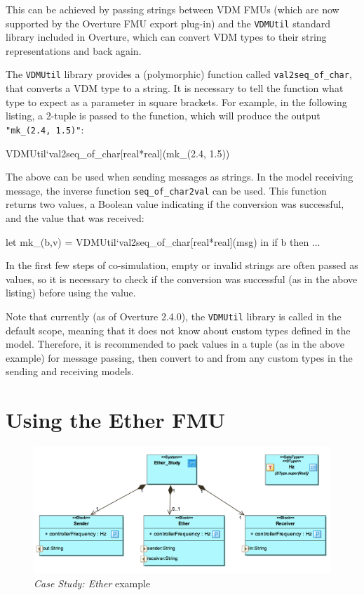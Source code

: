 This can be achieved by passing strings between VDM FMUs (which are now supported by the Overture FMU export plug-in) and the \texttt{VDMUtil} standard library included in Overture, which can convert VDM types to their string representations and back again.

The \texttt{VDMUtil} library provides a (polymorphic) function called \texttt{val2seq\_of\_char}, that converts a VDM type to a string. It is necessary to tell the function what type to expect as a parameter in square brackets. For example, in the following listing, a 2-tuple is passed to the function, which will produce the output \texttt{"mk\_(2.4, 1.5)"}:

\begin{vdm}
VDMUtil`val2seq_of_char[real*real](mk_(2.4, 1.5))
\end{vdm}

The above can be used when sending messages as strings. In the model receiving message, the inverse function \texttt{seq\_of\_char2val} can be used. This function returns two values, a Boolean value indicating if the conversion was successful, and the value that was received:

\begin{vdm}
let mk_(b,v) = VDMUtil`val2seq_of_char[real*real](msg) in
  if b then ...
\end{vdm}

In the first few steps of co-simulation, empty or invalid strings are often passed as values, so it is necessary to check if the conversion was successful (as in the above listing) before using the value.

Note that currently (as of Overture 2.4.0), the \texttt{VDMUtil} library is called in the default scope, meaning that it does not know about custom types defined in the model. Therefore, it is recommended to pack values in a tuple (as in the above example) for message passing, then convert to and from any custom types in the sending and receiving models.

\section{Using the Ether FMU}

\begin{figure}
\centering
\includegraphics[scale=0.3]{figures/ether_asd}
\caption{\emph{Case Study: Ether} example}
\label{fig:ether_asd}
\end{figure}

